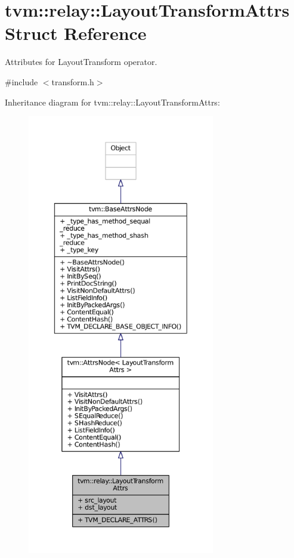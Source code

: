 \hypertarget{structtvm_1_1relay_1_1LayoutTransformAttrs}{}\section{tvm\+:\+:relay\+:\+:Layout\+Transform\+Attrs Struct Reference}
\label{structtvm_1_1relay_1_1LayoutTransformAttrs}


Attributes for Layout\+Transform operator.  




{\ttfamily \#include $<$transform.\+h$>$}



Inheritance diagram for tvm\+:\+:relay\+:\+:Layout\+Transform\+Attrs\+:
\nopagebreak
\begin{figure}[H]
\begin{center}
\leavevmode
\includegraphics[height=550pt]{structtvm_1_1relay_1_1LayoutTransformAttrs__inherit__graph}
\end{center}
\end{figure}


